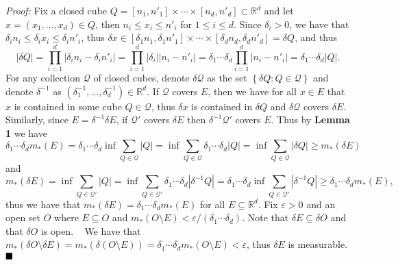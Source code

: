 \documentclass[12pt]{article}
\newcommand{\R}{\mathbb{R}}
\newcommand{\e}{\ensuremath{\varepsilon}}
\renewcommand{\d}{\ensuremath{\delta}}
\newcommand{\braceb}[1]{\left\{#1\right\}}
\newcommand{\vertb}[1]{\left\vert#1\right\vert}
\newcommand{\sdiff}{\setminus}
\newcommand{\proof}{\textit{Proof: }}
\newcommand{\done}{\ensuremath{\strut\hfill\blacksquare}}
\newcommand{\mc}[1]{\ensuremath{\mathcal{#1}}}
\begin{document}
\proof
Fix a closed cube
\( Q = [n_1,n'_1] \times \cdots \times [n_d,n'_d] \subset \R^d \) and
let \( x = (x_1,\dots,x_d) \in Q \), then \( n_i \leq x_i \leq n'_i \) for
\( 1 \leq i \leq d \).
Since \( \d_i > 0 \), we have that \( \d_in_i \leq \d_ix_i \leq \d_in'_i \),
thus
\(
	\d x
	\in [\d_1n_1,\d_1n'_1] \times \cdots \times [\d_dn_d,\d_dn'_d]
	= \d Q
\),
and thus
\[
	\vertb{\d Q}
	= \prod_{i = 1}^d \vertb{\d_in_i - \d_in'_i}
	= \prod_{i = 1}^d \vertb{\d_i}\vertb{n_i - n'_i}
	= \d_1\cdots\d_d \prod_{i = 1}^d \vertb{n_i - n'_i}
	= \d_1\cdots\d_d \vertb{Q}.
\]
For any collection \mc{Q} of closed cubes, denote \( \delta\mc{Q} \) as the set
\( \braceb{\d Q : Q \in \mc{Q}} \) and denote \( \d^{-1} \) as
\( (\d_1^{-1},\dots,\d_d^{-1}) \in \R^d \).
If \mc{Q} covers \( E \), then we have for all \( x \in E \) that \( x \) is
contained in some cube \( Q \in \mc{Q} \), thus \( \delta x \) is contained in
\( \d Q \) and \( \d\mc{Q} \) covers \( \d E \).
Similarly, since \( E = \d^{-1}\d E \), if \( \mc{Q}' \) covers \( \d E \) then
\( \d^{-1}\mc{Q}' \) covers
\( E \).
Thus by \textbf{Lemma 1} we have
\[
	\d_1\cdots\d_d m_*(E)
	= \d_1\cdots\d_d \inf\sum_{Q \in \mc{Q}} \vertb{Q}
	= \inf\sum_{Q \in \mc{Q}} \d_1\cdots\d_d\vertb{Q}
	= \inf\sum_{Q \in \mc{Q}} \vertb{\d Q}
	\geq m_*(\d E)
\]
and
\[
	m_*(\d E)
	= \inf\sum_{Q \in \mc{Q}'} \vertb{Q}
	= \inf\sum_{Q \in \mc{Q}'} \d_1\cdots\d_d\vertb{\d^{-1}Q}
	= \d_1\cdots\d_d \inf\sum_{Q \in \mc{Q}'} \vertb{\d^{-1}Q}
	\geq \d_1\cdots\d_dm_*(E),
\]
thus we have that \( m_*(\d E) = \d_1\cdots\d_dm_*(E) \) for all
\( E \subseteq \R^d \).
Fix \( \e > 0 \) and an open set \( O \) where \( E \subseteq O \) and
\( m_*(O \sdiff E) < \e/(\d_1\cdots\d_d) \).
Note that \( \d E \subseteq \d O \) and that \( \d O \) is open.
~\cite{DilationOfOpenSet}
We have that
\(
	m_*(\d O \sdiff \d E)
	= m_*(\d(O \sdiff E))
	= \d_1\cdots\d_dm_*(O \sdiff E)
	< \e
\),
thus \( \d E \) is measurable.
\done

{}
\end{document}
